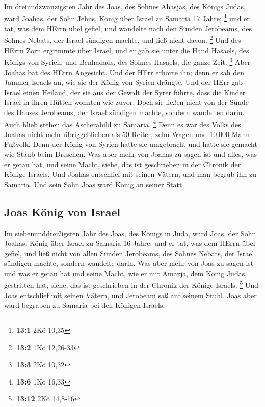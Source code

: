  Im dreiundzwanzigsten Jahr des Joas, des Sohnes Ahasjas,
des Königs Judas, ward Joahas, der Sohn Jehus, König über Israel zu
Samaria 17 Jahre; \footnote{\textbf{13:1} 2Kö 10,35}  und
er tat, was dem HErrn übel gefiel, und wandelte nach den Sünden
Jerobeams, des Sohnes Nebats, der Israel sündigen machte, und ließ nicht
davon. \footnote{\textbf{13:2} 1Kö 12,26-33}  Und des
HErrn Zorn ergrimmte über Israel, und er gab sie unter die Hand Hasaels,
des Königs von Syrien, und Benhadads, des Sohnes Hasaels, die ganze
Zeit. \footnote{\textbf{13:3} 2Kö 10,32}  Aber Joahas bat
des HErrn Angesicht. Und der HErr erhörte ihn; denn er sah den Jammer
Israels an, wie sie der König von Syrien drängte.  Und der
HErr gab Israel einen Heiland, der sie aus der Gewalt der Syrer führte,
dass die Kinder Israel in ihren Hütten wohnten wie zuvor. 
Doch sie ließen nicht von der Sünde des Hauses Jerobeams, der Israel
sündigen machte, sondern wandelten darin. Auch blieb stehen das
Ascherabild zu Samaria. \footnote{\textbf{13:6} 1Kö 16,33}
 Denn es war des Volks des Joahas nicht mehr
übriggeblieben als 50 Reiter, zehn Wagen und 10.000 Mann Fußvolk. Denn
der König von Syrien hatte sie umgebracht und hatte sie gemacht wie
Staub beim Dreschen.  Was aber mehr von Joahas zu sagen
ist und alles, was er getan hat, und seine Macht, siehe, das ist
geschrieben in der Chronik der Könige Israels.  Und Joahas
entschlief mit seinen Vätern, und man begrub ihn zu Samaria. Und sein
Sohn Joas ward König an seiner Statt.

\hypertarget{joas-kuxf6nig-von-israel}{%
\subsection{Joas König von Israel}\label{joas-kuxf6nig-von-israel}}

 Im siebenunddreißigsten Jahr des Joas, des Königs in
Juda, ward Joas, der Sohn Joahas, König über Israel zu Samaria 16 Jahre;
 und er tat, was dem HErrn übel gefiel, und ließ nicht
von allen Sünden Jerobeams, des Sohnes Nebats, der Israel sündigen
machte, sondern wandelte darin.  Was aber mehr von Joas
zu sagen ist und was er getan hat und seine Macht, wie er mit Amazja,
dem König Judas, gestritten hat, siehe, das ist geschrieben in der
Chronik der Könige Israels. \footnote{\textbf{13:12} 2Kö 14,8-16}
 Und Joas entschlief mit seinen Vätern, und Jerobeam saß
auf seinem Stuhl. Joas aber ward begraben zu Samaria bei den Königen
Israels.

